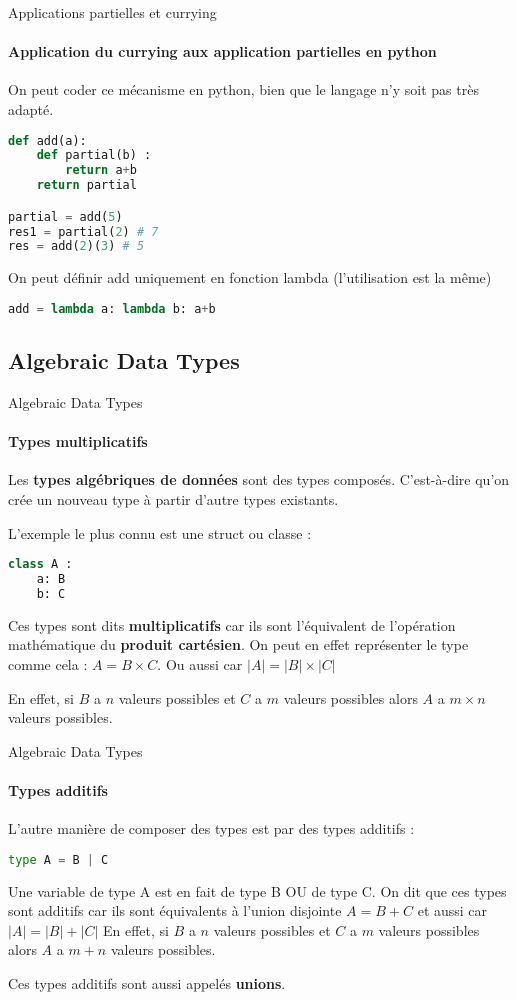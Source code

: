 \documentclass[aspectratio=169]{beamer}
\begin{document}
\begin{frame}[fragile]{Applications partielles et currying}

    \framesubtitle{Application du currying aux application partielles en python}

    On peut coder ce mécanisme en python, bien que le langage n'y soit pas très adapté.

    \begin{lstlisting}[language=Python]
def add(a):
    def partial(b) :
        return a+b
    return partial

partial = add(5)
res1 = partial(2) # 7
res = add(2)(3) # 5
    \end{lstlisting}

On peut définir add uniquement en fonction lambda (l'utilisation est la même)

    \begin{lstlisting}[language=Python]
add = lambda a: lambda b: a+b
    \end{lstlisting}

\end{frame}

\subsection{Algebraic Data Types}

\begin{frame}[fragile]{Algebraic Data Types}
    \framesubtitle{Types multiplicatifs}
    Les \textbf{types algébriques de données} sont des types composés. C'est-à-dire qu'on crée un nouveau type à partir d'autre types existants.

    L'exemple le plus connu est une struct ou classe :

    \begin{lstlisting}[language=Python]
class A :
    a: B
    b: C
    \end{lstlisting}

    Ces types sont dits \textbf{multiplicatifs} car ils sont l'équivalent de l'opération mathématique du \textbf{produit cartésien}. On peut en effet représenter le type comme cela : $ A = B \times C$. Ou aussi car $|A| = |B| \times |C|$
    
    En effet, si $B$ a $n$ valeurs possibles et $C$ a $m$ valeurs possibles alors $A$ a $m\times n$ valeurs possibles.
\end{frame}

\begin{frame}[fragile]{Algebraic Data Types}
    \framesubtitle{Types additifs}
    L'autre manière de composer des types est par des types additifs :
    \begin{lstlisting}[language=Python]
type A = B | C
    \end{lstlisting}
    Une variable de type A est en fait de type B OU de type C. On dit que ces types sont additifs car ils sont équivalents à l'union disjointe $A = B+C$ et aussi car $|A|=|B|+|C|$
    En effet, si $B$ a $n$ valeurs possibles et $C$ a $m$ valeurs possibles alors $A$ a $m + n$ valeurs possibles.

    Ces types additifs sont aussi appelés \textbf{unions}.
\end{frame}
\end{document}
